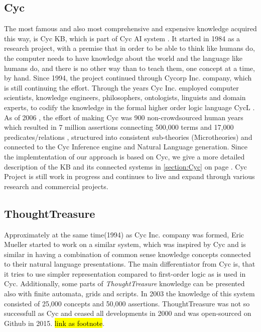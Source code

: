 \subsection{Cyc} The most famous and also most comprehensive and expensive 
knowledge acquired this way, is Cyc KB, which is part of Cyc AI system 
\parencite{Lenat1995}. It started in 1984 as a research project, with a premise 
that in order to be able to think like humans do, the computer needs to have 
knowledge about the world and the language like humans do, and there is no other
way than to teach them, one concept at a time, by hand. Since 1994, the project 
continued through Cycorp Inc. company, which is still continuing the effort. 
Through the years Cyc Inc. employed computer scientists, knowledge engineers, 
philosophers, ontologists, linguists and domain experts, to codify the knowledge
in the formal higher order logic language CycL \parencite{Matuszek2006a}. As of 
2006 \parencite{Matuszek2006}, the effort of making Cyc was 900 non-crowdsourced 
human years which resulted in 7 million assertions connecting 500,000 terms and 
17,000 predicates/relations \parencite{Zang2013}, structured into consistent 
sub-theories (Microtheories) and connected to the Cyc Inference engine and 
Natural Language generation. Since the implemtentation of our approach is based
on Cyc, we give a more detailed description of the KB and its connected systems
in \autoref{section:Cyc} on page \pageref{section:Cyc}. Cyc Project is still 
work in progress and continues to live and expand through various research and
commercial projects.

\subsection{ThoughtTreasure} Approximately at the same time(1994) as Cyc Inc. 
company was formed, Eric Mueller started to work on a similar system, which was
inspired by Cyc and is similar in having a combination of common sense knowledge
concepts connected to their natural language presentations. The main 
differentiator from Cyc is, that it tries to use simpler representation compared
to first-order logic as is used in Cyc. Additionally, some parts of 
\emph{ThoughtTreasure} knowledge can be presented also with finite automata, 
grids and scripts\parencite{Mueller1999,Mueller2003}. In 2003 the knowledge of
this system consisted of 25,000 concepts and 50,000 assertions. ThoughtTreasure 
was not so successfull as Cyc and ceased all developments in 2000 and was 
open-sourced on Github in 2015. \hl{link as footnote}.

